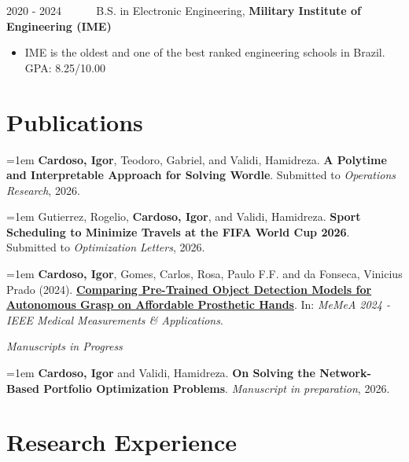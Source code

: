 \documentclass[a4paper,11pt]{article}
\begin{document}
2020 - 2024 \hspace{1.5mm}~~~~~ B.S. in Electronic Engineering, \textbf{Military Institute of Engineering (IME)}
\vspace{-1mm}
\begin{itemize}[leftmargin=80pt]
    \item IME is the oldest and one of the best ranked engineering schools in Brazil. GPA: 8.25/10.00
\end{itemize}
\vspace{-2mm}


\section{\textbf{Publications}}
\vspace{2mm}

\noindent\hangindent=1em
\textbf{Cardoso, Igor}, Teodoro, Gabriel, and Validi, Hamidreza.
\textbf{A Polytime and Interpretable Approach for Solving Wordle}.
Submitted to \textit{Operations Research}, 2026.
\vspace{2mm}

\noindent\hangindent=1em
Gutierrez, Rogelio, \textbf{Cardoso, Igor}, and Validi, Hamidreza.
\textbf{Sport Scheduling to Minimize Travels at the FIFA World Cup 2026}.
Submitted to \textit{Optimization Letters}, 2026.
\vspace{2mm}

\noindent\hangindent=1em
\textbf{Cardoso, Igor}, Gomes, Carlos, Rosa, Paulo F.F. and da Fonseca, Vinicius Prado (2024). \href{https://ieeexplore.ieee.org/document/10596873}{\textbf{Comparing Pre-Trained Object Detection Models for Autonomous Grasp on Affordable Prosthetic Hands}}. In: \textit{MeMeA 2024 - IEEE Medical Measurements \& Applications}.
\vspace{2mm}

\textit{\small{Manuscripts in Progress}}
\vspace{1mm}

\noindent\hangindent=1em
\textbf{Cardoso, Igor} and Validi, Hamidreza.
\textbf{On Solving the Network-Based Portfolio Optimization Problems}.
\textit{Manuscript in preparation}, 2026.


\section{\textbf{Research Experience}}
\vspace{2mm}
\end{document}
